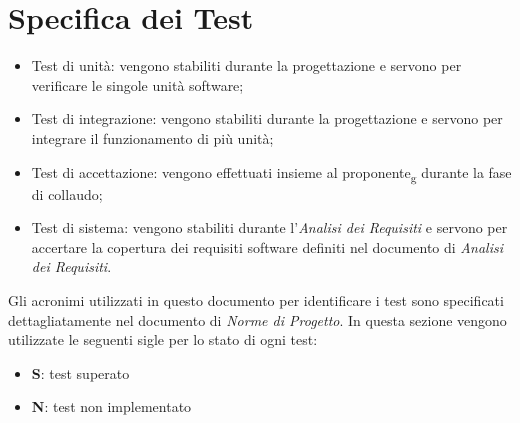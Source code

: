 \section{Specifica dei Test}
\begin{itemize}
\item Test di unità: vengono stabiliti durante la progettazione e servono per verificare le singole unità software;
\item Test di integrazione: vengono stabiliti durante la progettazione e servono per integrare il funzionamento di più unità;
\item Test di accettazione: vengono effettuati insieme al proponente\textsubscript{g} durante la fase di collaudo;
\item Test di sistema: vengono stabiliti durante l'\textit{Analisi dei Requisiti} e servono per accertare la copertura dei requisiti software definiti nel documento di \textit{Analisi dei Requisiti}.
\end{itemize}
Gli acronimi utilizzati in questo documento per identificare i test sono specificati dettagliatamente nel documento di \textit{Norme di Progetto}.
In questa sezione vengono utilizzate le seguenti sigle per lo stato di ogni test:
\begin{itemize}
\item \textbf{S}: test superato
\item \textbf{N}: test non implementato
\end{itemize}

